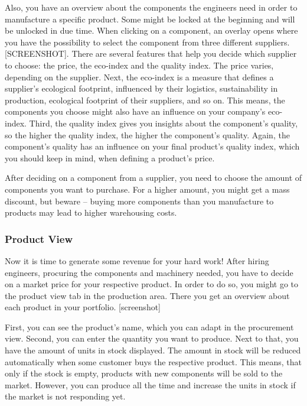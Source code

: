 Also, you have an overview about the components the engineers need in order to manufacture a specific product. Some might be locked at the beginning and will be unlocked in due time. When clicking on a component, an overlay opens where you have the possibility to select the component from three different suppliers. [SCREENSHOT]. There are several features that help you decide which supplier to choose: the price, the eco-index and the quality index. The price varies, depending on the supplier. Next, the eco-index is a measure that defines a supplier’s ecological footprint, influenced by their logistics, sustainability in production, ecological footprint of their suppliers, and so on. This means, the components you choose might also have an influence on your company’s eco-index. Third, the quality index gives you insights about the component’s quality, so the higher the quality index, the higher the component’s quality. Again, the component’s quality has an influence on your final product’s quality index, which you should keep in mind, when defining a product’s price.

After deciding on a component from a supplier, you need to choose the amount of components you want to purchase. For a higher amount, you might get a mass discount, but beware --  buying more components than you manufacture to products may lead to higher warehousing costs. 

\subsubsection{Product View}
\label{sub:ProductView}
Now it is time to generate some revenue for your hard work! After hiring engineers, procuring the components and machinery needed, you have to decide on a market price for your respective product. In order to do so, you might go to the product view tab in the production area. There you get an overview about each product in your portfolio. [screenshot]

First, you can see the product’s name, which you can adapt in the procurement view. Second, you can enter the quantity you want to produce. Next to that, you have the amount of units in stock displayed. The amount in stock will be reduced automatically when some customer buys the respective product. This means, that only if the stock is empty, products with new components will be sold to the market. However, you can produce all the time and increase the units in stock if the market is not responding yet. 

